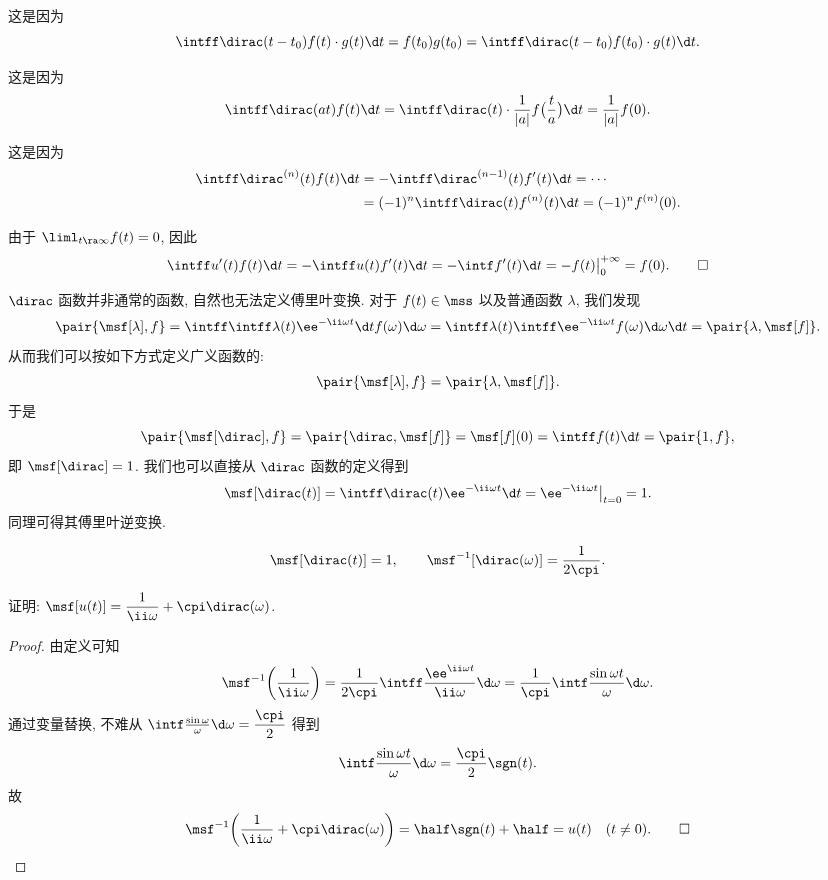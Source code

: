 \begin{proofenuma}
  \item 这是因为
  \[
    \intff \dirac(t-t_0)f(t)\cdot g(t)\d t=f(t_0)g(t_0)
    =\intff \dirac(t-t_0)f(t_0)\cdot g(t)\d t.
  \]
  \item 这是因为
  \[
    \intff \dirac(at)f(t)\d t
    =\intff \dirac(t)\cdot \frac1{|a|}f\bigl(\frac ta\bigr)\d t
    =\frac1{|a|}f(0).
  \]
  \item 这是因为
  \begin{align*}
    \intff \dirac^{(n)}(t)f(t)\d t
    &=-\intff \dirac^{(n-1)}(t)f'(t)\d t
    =\cdots\\
    &=(-1)^n\intff \dirac(t)f^{(n)}(t)\d t
    =(-1)^nf^{(n)}(0).
  \end{align*}
  \item 由于 $\liml_{t\ra\infty}f(t)=0$, 因此
  \[
    \intff u'(t)f(t)\d t
    =-\intff u(t)f'(t)\d t
    =-\intf f'(t)\d t
    =-f(t)\big|_0^{+\infty}
    =f(0).\qedhere
  \]
\end{proofenuma}

$\dirac$ 函数并非通常的函数, 自然也无法定义傅里叶变换.
对于 $f(t)\in\mss$ 以及普通函数 $\lambda$, 我们发现
\begin{align*}
  \pair{\msf[\lambda],f}
  =\intff\intff \lambda(t)\ee^{-\ii \omega t}\d t f(\omega)\d \omega
  =\intff\lambda(t) \intff \ee^{-\ii \omega t}f(\omega)\d \omega\d t 
  =\pair{\lambda,\msf[f]}.
\end{align*}
从而我们可以按如下方式定义广义函数的:
\[
  \pair{\msf[\lambda],f}=\pair{\lambda,\msf[f]}.
\]
于是
\[
  \pair{\msf[\dirac],f}
  =\pair{\dirac,\msf[f]}
  =\msf[f](0)
  =\intff f(t)\d t=\pair{1,f},
\]
即 $\msf[\dirac]=1$.
我们也可以直接从 $\dirac$ 函数的定义得到
\[
  \msf[\dirac(t)]
  =\intff \dirac(t)\ee^{-\ii \omega t}\d t
  =\ee^{-\ii \omega t}\big|_{t=0}
  =1.
\]
同理可得其傅里叶逆变换.

\begin{theorem}
  \[
    \msf[\dirac(t)]=1,\qquad
    \msf^{-1}[\dirac(\omega)]=\dfrac1{2\cpi}.
  \]
\end{theorem}

\begin{example}\label{exam:fourier-transform-ut}
  证明: $\msf[u(t)]=\dfrac1{\ii \omega}+\cpi\dirac(\omega)$.
\end{example}

\begin{proof}
  由定义可知
  \[
    \msf^{-1}\biggl(\frac1{\ii \omega}\biggr)
    =\frac1{2\cpi}\intff \frac{\ee^{\ii \omega t}}{\ii \omega} \d\omega
    =\frac1\cpi\intf\frac{\sin\omega t}{\omega} \d\omega.
  \]
  通过变量替换, 不难从 $\intf\frac{\sin\omega}\omega \d\omega=\dfrac\cpi2$ 得到
  \[
    \intf\frac{\sin\omega t}\omega \d\omega=\frac\cpi2\sgn(t).
  \]
  故
  \[
    \msf^{-1} \biggl(\frac1{\ii \omega}+\cpi\dirac(\omega)\biggr)
    =\half\sgn(t)+\half =u(t)\quad (t\neq 0).\qedhere
  \]
\end{proof}


